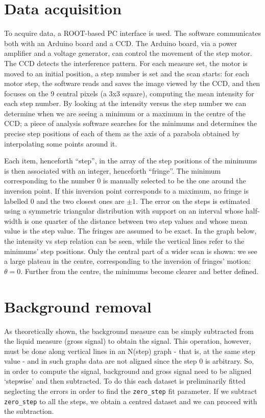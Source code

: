 \documentclass[a4paper, 12pt]{article}
\begin{document}
\section{Data acquisition}

To acquire data, a ROOT-based PC interface is used. The software communicates both with an Arduino board and a CCD. The Arduino board, via a power amplifier and a voltage generator, can control the movement of the step motor. The CCD detects the interference pattern. For each measure set, the motor is moved to an initial position, a step number is set and the scan starts: for each motor step, the software reads and saves the image viewed by the CCD, and then focuses on the 9 central pixels (a 3x3 square), computing the mean intensity for each step number. By looking at the intensity versus the step number we can determine when we are seeing a minimum or a maximum in the centre of the CCD; a piece of analysis software searches for the minimums and determines the precise step positions of each of them as the axis of a parabola obtained by interpolating some points around it.

Each item, henceforth “step”, in the array of the step positions of the minimums is then associated with an integer, henceforth “fringe”. The minimum corresponding to the number 0 is manually selected to be the one around the inversion point. If this inversion point corresponds to a maximum, no fringe is labelled 0 and the two closest ones are $\pm 1$.
The error on the steps is estimated using a symmetric triangular distribution with support on an interval whose half-width is one quarter of the distance between two step values and whose mean value is the step value. The fringes are assumed to be exact.
In the graph below, the intensity vs step relation can be seen, while the vertical lines refer to the minimums’ step positions. Only the central part of a wider scan is shown: we see a large plateau in the centre, corresponding to the inversion of fringes’ motion: \(\theta
=0\). Further from the centre, the minimums become clearer and better defined.


\section{Background removal}

As theoretically shown, the background measure can be simply subtracted from the liquid measure (gross signal) to obtain the signal. This operation, however, must be done along vertical lines in an N(step) graph - that is, at the same step value -  and in such graphs data are not aligned since the step 0 is arbitrary.
So, in order to compute the signal, background and gross signal need to be aligned ‘stepwise’ and then subtracted.
To do this each dataset is preliminarily fitted neglecting the errors in order to find the \lstinline{zero_step} fit parameter.
If we subtract \lstinline{zero_step} to all the steps, we obtain a centred dataset and we can proceed with the subtraction.
\end{document}

